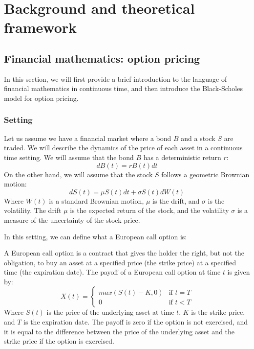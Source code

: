 \chapter{Background and theoretical framework}
\label{ch:background}

\section{Financial mathematics: option pricing}
\label{sec:financial_background}
In this section, we will first provide a brief introduction to the language of financial mathematics in continuous time, and then introduce the Black-Scholes model for option pricing.

\subsection{Setting}
Let us assume we have a financial market where a bond $B$ and a stock $S$ are traded. We will describe the dynamics of the price of each asset in a continuous time setting. We will assume that the bond $B$ has a deterministic return $r$:
\begin{equation}
    \label{eq:bond}
    dB(t) = r B(t) dt
\end{equation}
On the other hand, we will assume that the stock $S$ follows a geometric Brownian motion:
\begin{equation}
    \label{eq:stock}
    dS(t) = \mu S(t) dt + \sigma S(t) dW(t)
\end{equation}
Where $W(t)$ is a standard Brownian motion, $\mu$ is the drift, and $\sigma$ is the volatility. The drift $\mu$ is the expected return of the stock, and the volatility $\sigma$ is a measure of the uncertainty of the stock price.

In this setting, we can define what a European call option is:
\begin{definition}
    A European call option is a contract that gives the holder the right, but not the obligation, to buy an asset at a specified price (the strike price) at a specified time (the expiration date). The payoff of a European call option at time $t$ is given by:
    \begin{equation}
        X(t) = \begin{cases}
            max(S(t)-K,0) & \text{if } t = T\\
            0 & \text{if } t < T
        \end{cases}
    \end{equation}
    Where $S(t)$ is the price of the underlying asset at time $t$, $K$ is the strike price, and $T$ is the expiration date. The payoff is zero if the option is not exercised, and it is equal to the difference between the price of the underlying asset and the strike price if the option is exercised.
\end{definition}


